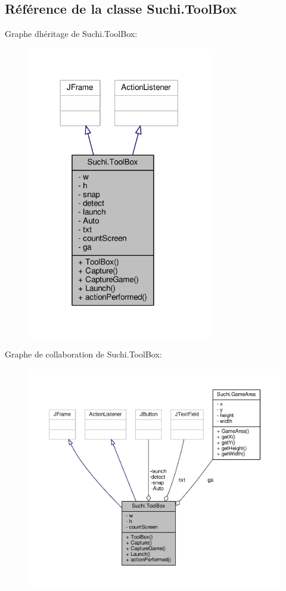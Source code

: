 \hypertarget{classSuchi_1_1ToolBox}{}\subsection{Référence de la classe Suchi.\+Tool\+Box}
\label{classSuchi_1_1ToolBox}


Graphe d\textquotesingle{}héritage de Suchi.\+Tool\+Box\+:\nopagebreak
\begin{figure}[H]
\begin{center}
\leavevmode
\includegraphics[width=228pt]{classSuchi_1_1ToolBox__inherit__graph}
\end{center}
\end{figure}


Graphe de collaboration de Suchi.\+Tool\+Box\+:\nopagebreak
\begin{figure}[H]
\begin{center}
\leavevmode
\includegraphics[width=350pt]{classSuchi_1_1ToolBox__coll__graph}
\end{center}
\end{figure}
